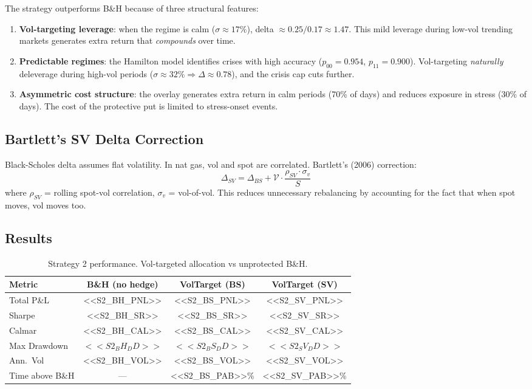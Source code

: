 \documentclass[11pt,a4paper]{article}
\begin{document}
The strategy outperforms B\&H because of three structural features:
\begin{enumerate}[nosep]
\item \textbf{Vol-targeting leverage}: when the regime is calm ($\sigma \approx 17\%$), delta $\approx 0.25/0.17 \approx 1.47$. This mild leverage during low-vol trending markets generates extra return that \emph{compounds} over time.
\item \textbf{Predictable regimes}: the Hamilton model identifies crises with high accuracy ($p_{00} = 0.954$, $p_{11} = 0.900$). Vol-targeting \emph{naturally} deleverage during high-vol periods ($\sigma \approx 32\% \Rightarrow \Delta \approx 0.78$), and the crisis cap cuts further.
\item \textbf{Asymmetric cost structure}: the overlay generates extra return in calm periods (70\% of days) and reduces exposure in stress (30\% of days). The cost of the protective put is limited to stress-onset events.
\end{enumerate}

\subsection{Bartlett's SV Delta Correction}

Black-Scholes delta assumes flat volatility. In nat gas, vol and spot are correlated. Bartlett's (2006) correction:
\begin{equation}
\Delta_{SV} = \Delta_{BS} + \mathcal{V} \cdot \frac{\rho_{SV} \cdot \sigma_v}{S}
\end{equation}
where $\rho_{SV}$ = rolling spot-vol correlation, $\sigma_v$ = vol-of-vol. This reduces unnecessary rebalancing by accounting for the fact that when spot moves, vol moves too.

\subsection{Results}

\begin{table}[H]
\centering
\caption{Strategy 2 performance. Vol-targeted allocation vs unprotected B\&H.}
\label{tab:hedge}
\begin{tabular}{lccc}
\toprule
Metric & B\&H (no hedge) & VolTarget (BS) & VolTarget (SV) \\
\midrule
Total P\&L & <<S2_BH_PNL>> & <<S2_BS_PNL>> & <<S2_SV_PNL>> \\
Sharpe & <<S2_BH_SR>> & <<S2_BS_SR>> & <<S2_SV_SR>> \\
Calmar & <<S2_BH_CAL>> & <<S2_BS_CAL>> & <<S2_SV_CAL>> \\
Max Drawdown & $<<S2_BH_DD>>$ & $<<S2_BS_DD>>$ & $<<S2_SV_DD>>$ \\
Ann.\ Vol & <<S2_BH_VOL>> & <<S2_BS_VOL>> & <<S2_SV_VOL>> \\
Time above B\&H & --- & <<S2_BS_PAB>>\% & <<S2_SV_PAB>>\% \\
\bottomrule
\end{tabular}
\end{table}
\end{document}
